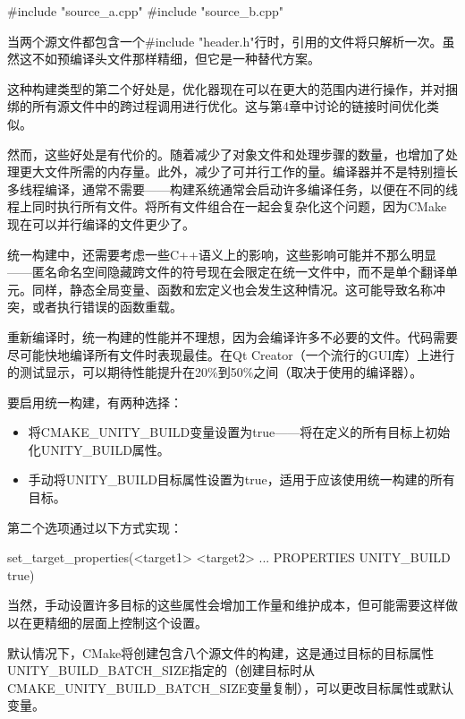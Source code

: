 \begin{cpp}
#include "source_a.cpp"
#include "source_b.cpp"
\end{cpp}

当两个源文件都包含一个\#include "header.h"行时，引用的文件将只解析一次。虽然这不如预编译头文件那样精细，但它是一种替代方案。

这种构建类型的第二个好处是，优化器现在可以在更大的范围内进行操作，并对捆绑的所有源文件中的跨过程调用进行优化。这与第4章中讨论的链接时间优化类似。

然而，这些好处是有代价的。随着减少了对象文件和处理步骤的数量，也增加了处理更大文件所需的内存量。此外，减少了可并行工作的量。编译器并不是特别擅长多线程编译，通常不需要——构建系统通常会启动许多编译任务，以便在不同的线程上同时执行所有文件。将所有文件组合在一起会复杂化这个问题，因为CMake现在可以并行编译的文件更少了。

统一构建中，还需要考虑一些C++语义上的影响，这些影响可能并不那么明显——匿名命名空间隐藏跨文件的符号现在会限定在统一文件中，而不是单个翻译单元。同样，静态全局变量、函数和宏定义也会发生这种情况。这可能导致名称冲突，或者执行错误的函数重载。

重新编译时，统一构建的性能并不理想，因为会编译许多不必要的文件。代码需要尽可能快地编译所有文件时表现最佳。在Qt Creator（一个流行的GUI库）上进行的测试显示，可以期待性能提升在20\%到50\%之间（取决于使用的编译器）。

要启用统一构建，有两种选择：

\begin{itemize}
\item
将CMAKE\_UNITY\_BUILD变量设置为true——将在定义的所有目标上初始化UNITY\_BUILD属性。

\item
手动将UNITY\_BUILD目标属性设置为true，适用于应该使用统一构建的所有目标。
\end{itemize}

第二个选项通过以下方式实现：

\begin{shell}
set_target_properties(<target1> <target2> ...
                      PROPERTIES UNITY_BUILD true)
\end{shell}

当然，手动设置许多目标的这些属性会增加工作量和维护成本，但可能需要这样做以在更精细的层面上控制这个设置。

默认情况下，CMake将创建包含八个源文件的构建，这是通过目标的目标属性UNITY\_BUILD\_BATCH\_SIZE指定的（创建目标时从CMAKE\_UNITY\_BUILD\_BATCH\_SIZE变量复制），可以更改目标属性或默认变量。

